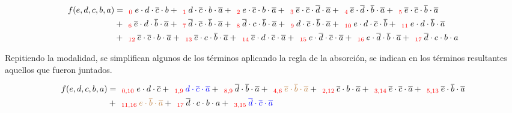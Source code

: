 \begin{align*}
f(e,d,c,b,a) & = _{\ \ \color{red} 0} {e \cdot d \cdot \overline{c} \cdot b} 
+ _{\ \ \color{red} 1}  {d \cdot \overline{c} \cdot b \cdot \overline{a}}
+ _{\ \ \color{red} 2}  {e \cdot \overline{c} \cdot b \cdot \overline{a}}
+ _{\ \ \color{red} 3}  {\overline{e} \cdot \overline{c} \cdot \overline{d} \cdot \overline{a}}
+ _{\ \ \color{red} 4}  {\overline{e} \cdot \overline{d} \cdot \overline{b} \cdot \overline{a}}
+ _{\ \ \color{red} 5}  {\overline{e} \cdot \overline{c} \cdot \overline{b} \cdot \overline{a}} \\
& + _{\ \ \color{red} 6}  {\overline{e} \cdot d \cdot \overline{b} \cdot \overline{a}} 
+ _{\ \ \color{red} 7}  {\overline{d} \cdot \overline{c} \cdot \overline{b} \cdot \overline{a}}
+ _{\ \ \color{red} 8}  {\overline{d} \cdot c \cdot \overline{b} \cdot \overline{a}}
+ _{\ \ \color{red} 9}  {d \cdot \overline{c} \cdot \overline{b} \cdot \overline{a}} 
+ _{\ \ \color{red} 10}  {e \cdot d \cdot \overline{c} \cdot \overline{b}}
+ _{\ \ \color{red} 11}  {e \cdot d \cdot \overline{b} \cdot \overline{a}} \\
& + _{\ \ \color{red} 12}  {\overline{e} \cdot \overline{c} \cdot b \cdot \overline{a}}
+ _{\ \ \color{red} 13}  {\overline{e} \cdot c \cdot \overline{b} \cdot \overline{a}} 
+ _{\ \ \color{red} 14}  {\overline{e} \cdot d \cdot \overline{c} \cdot \overline{a}}
+ _{\ \ \color{red} 15}  {e \cdot \overline{d} \cdot \overline{c} \cdot \overline{a}} 
+ _{\ \ \color{red} 16}  {e \cdot \overline{d} \cdot \overline{b} \cdot \overline{a}}
+ _{\ \ \color{red} 17}  {\overline{d} \cdot c \cdot b \cdot a}
\end{align*}

Repitiendo la modalidad, se simplifican algunos de los t\'erminos aplicando la regla de la absorci\'on,
se indican en los t\'erminos resultantes aquellos que fueron juntados.

\begin{align*}
f(e,d,c,b,a) & = _{\ \ \color{red} 0,10} {e \cdot d \cdot \overline{c}}
+ _{\ \ \color{red} 1,9} {\color{blue} d \cdot \overline{c} \cdot \overline{a}}
+ _{\ \ \color{red} 8,9} {\overline{d} \cdot \overline{b} \cdot \overline{a}}
+ _{\ \ \color{red} 4,6} {\color{brown} \overline{e} \cdot \overline{b} \cdot \overline{a}}
+ _{\ \ \color{red} 2,12} {\overline{c} \cdot b \cdot \overline{a}}
+ _{\ \ \color{red} 3,14} {\overline{e} \cdot \overline{c} \cdot \overline{a}}
+ _{\ \ \color{red} 5,13} {\overline{e} \cdot \overline{b} \cdot \overline{a}} \\
& + _{\ \ \color{red} 11,16} {\color{brown} e \cdot \overline{b} \cdot \overline{a}}
+ _{\ \ \color{red} 17} {\overline{d} \cdot c \cdot b \cdot a}
+ _{\ \ \color{red} 3,15} {\color{blue} \overline{d} \cdot \overline{c} \cdot \overline{a}}
\end{align*}

